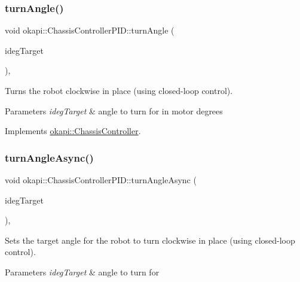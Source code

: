 \subsubsection{\texorpdfstring{turnAngle()}{turnAngle()}\hspace{0.1cm}{\footnotesize\ttfamily [2/2]}}
{\footnotesize\ttfamily void okapi\+::\+Chassis\+Controller\+P\+I\+D\+::turn\+Angle (\begin{DoxyParamCaption}\item[{double}]{ideg\+Target }\end{DoxyParamCaption})\hspace{0.3cm}{\ttfamily [override]}, {\ttfamily [virtual]}}

Turns the robot clockwise in place (using closed-\/loop control).


\begin{DoxyParams}{Parameters}
{\em ideg\+Target} & angle to turn for in motor degrees \\
\hline
\end{DoxyParams}


Implements \mbox{\hyperlink{classokapi_1_1ChassisController_a6aca227e35ececd02eed1cc42d09ad1d}{okapi\+::\+Chassis\+Controller}}.

\mbox{\label{classokapi_1_1ChassisControllerPID_a391c12c7b3cb5461cd28c4aebc4aeab0}} 
\subsubsection{\texorpdfstring{turnAngleAsync()}{turnAngleAsync()}\hspace{0.1cm}{\footnotesize\ttfamily [1/2]}}
{\footnotesize\ttfamily void okapi\+::\+Chassis\+Controller\+P\+I\+D\+::turn\+Angle\+Async (\begin{DoxyParamCaption}\item[{Q\+Angle}]{ideg\+Target }\end{DoxyParamCaption})\hspace{0.3cm}{\ttfamily [override]}, {\ttfamily [virtual]}}

Sets the target angle for the robot to turn clockwise in place (using closed-\/loop control).


\begin{DoxyParams}{Parameters}
{\em ideg\+Target} & angle to turn for \\
\hline
\end{DoxyParams}


